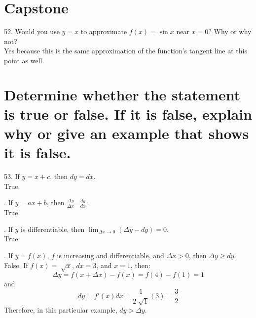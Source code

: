 \documentclass[11pt]{article}
\newcommand*{\vs}{\vspace{1cm}}
\newcommand*{\next}{\noindent}
\begin{document}
\section{Capstone}
52. Would you use $y=x$ to approximate $f(x)=\sin x$ near $x=0$? Why or why not?\\
\indent Yes because this is the same approximation of the function's tangent line at this point as well.

\section{Determine whether the statement is true or false. If it is false, explain why or give an example that shows it is false.}
53. If $y=x+c$, then $dy=dx$.\\
\indent True.

\vs\next
54. If $y=ax+b$, then $\frac{\Delta y}{\Delta x}$=$\frac{dy}{dx}$.\\
\indent True.

\vs\next
55. If $y$ is differentiable, then $\lim_{\Delta x\to 0}(\Delta y-dy)=0$.\\
\indent True.

\vs\next
56. If $y=f(x)$, $f$ is increasing and differentiable, and $\Delta x>0$, then $\Delta y\geq dy$.\\
\indent False. If $f(x)=\sqrt[]{x}$, $dx=3$, and $x=1$, then:
\[\Delta y=f(x+\Delta x)-f(x)=f(4)-f(1)=1\] \indent and \[dy=f'(x)dx=\frac{1}{2\sqrt[]{1}}(3)=\frac{3}{2}\]
\indent Therefore, in this particular example, $dy>\Delta y$.
\end{document}
